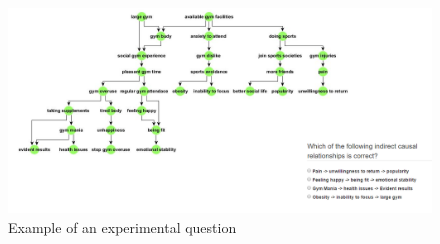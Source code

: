 \documentclass{l4proj}
\begin{document}
\begin{appendices}
\begin{figure}
\centering
\includegraphics[width=24cm]{exampleQuestion.PNG}
\caption{Example of an experimental question}
\label{exampleQuestion}
\end{figure}


\end{appendices}



\end{document}
